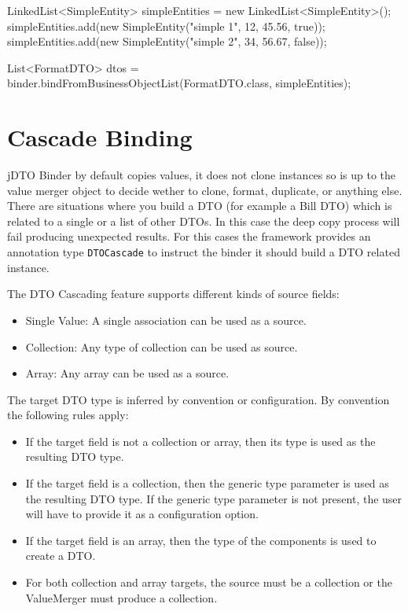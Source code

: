 \documentclass[11pt]{article}
\newcommand{\JDTO}{jDTO Binder\xspace}
\begin{document}
\begin{java}
LinkedList<SimpleEntity> simpleEntities = 
    new LinkedList<SimpleEntity>();
simpleEntities.add(new SimpleEntity("simple 1", 12, 45.56, true));
simpleEntities.add(new SimpleEntity("simple 2", 34, 56.67, false));

List<FormatDTO> dtos = binder.bindFromBusinessObjectList(FormatDTO.class, simpleEntities);
\end{java}


\section{Cascade Binding}


\JDTO by default copies values, it does not clone instances so is up to the value merger object to decide wether to clone, format, duplicate, or anything else. 
There are situations where you build a DTO (for example a Bill DTO) which is related to a single or a list of other DTOs. In this case the deep copy process will fail producing unexpected results. For this cases the framework provides an annotation type \texttt{DTOCascade} to instruct the binder it should build a DTO related instance.

The DTO Cascading feature supports different kinds of source fields:

\begin{itemize}
\item Single Value: A single association can be used as a source.
\item Collection: Any type of collection can be used as source.
\item Array: Any array can be used as a source. 
\end{itemize}


The target DTO type is inferred by convention or configuration. By convention the following rules apply:


\begin{itemize}
 \item If the target field is not a collection or array, then its type is used as the resulting DTO type.
 \item If the target field is a collection, then the generic type parameter is used as the resulting DTO type. If the generic type parameter is not present, the user will have to provide it as a configuration option.
 \item If the target field is an array, then the type of the components is used to create a DTO.
 \item For both collection and array targets, the source must be a collection or the ValueMerger must produce a collection.
\end{itemize}
\end{document}
